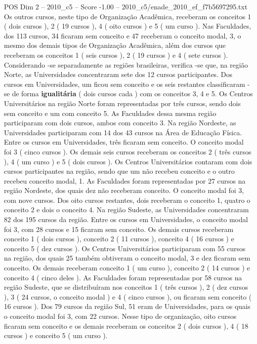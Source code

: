 \begin{textsample}{POS Dim 2 – 2010\_c5 – Score -1.00 – 2010\_c5/enade\_2010\_ef\_f7b5697295.txt}
Os outros cursos, neste tipo de Organização Acadêmica, receberam os conceitos 1 ( dois cursos ), 2 ( 19 cursos ), 4 ( oito cursos ) e 5 ( um curso ).
Nas Faculdades, dos 113 cursos, 34 ficaram sem conceito e 47 receberam o conceito modal, 3, o mesmo dos demais tipos de Organização Acadêmica, além dos cursos que receberam os conceitos 1 ( seis cursos ), 2 ( 19 cursos ) e 4 ( sete cursos ).
Considerando -se separadamente as regiões brasileiras, verifica -se que, na região Norte, as Universidades concentraram sete dos 12 cursos participantes.
Dos cursos em Universidades, um ficou sem conceito e os seis restantes classificaram -se de forma \textbf{igualitária} ( dois cursos cada ) com os conceitos 3, 4 e 5.
Os Centros Universitários na região Norte foram representadas por três cursos, sendo dois sem conceito e um com conceito 5.
As Faculdades dessa mesma região participaram com dois cursos, ambos com conceito 3.
Na região Nordeste, as Universidades participaram com 14 dos 43 cursos na Área de Educação Física.
Entre os cursos em Universidades, três ficaram sem conceito.
O conceito modal foi 3 ( cinco cursos ).
Os demais seis cursos receberam os conceitos 2 ( três cursos ), 4 ( um curso ) e 5 ( dois cursos ).
Os Centros Universitários contaram com dois cursos participantes na região, sendo que um não recebeu conceito e o outro recebeu conceito modal, 1.
As Faculdades foram representadas por 27 cursos na região Nordeste, dos quais dez não receberam conceito.
O conceito modal foi 3, com nove cursos.
Dos oito cursos restantes, dois receberam o conceito 1, quatro o conceito 2 e dois o conceito 4.
Na região Sudeste, as Universidades concentraram 82 dos 195 cursos da região.
Entre os cursos em Universidades, o conceito modal foi 3, com 28 cursos e 15 ficaram sem conceito.
Os demais cursos receberam conceito 1 ( dois cursos ), conceito 2 ( 11 cursos ), conceito 4 ( 16 cursos ) e conceito 5 ( dez cursos ).
Os Centros Universitários participaram com 55 cursos na região, dos quais 25 também obtiveram o conceito modal, 3 e dez ficaram sem conceito.
Os demais receberam conceito 1 ( um curso ), conceito 2 ( 14 cursos ) e conceito 4 ( cinco deles ).
As Faculdades foram representadas por 58 cursos na região Sudeste, que se distribuíram nos conceitos 1 ( três cursos ), 2 ( dez cursos ), 3 ( 24 cursos, o conceito modal ) e 4 ( cinco cursos ), ou ficaram sem conceito ( 16 cursos ).
Dos 79 cursos da região Sul, 51 eram de Universidades, para os quais o conceito modal foi 3, com 22 cursos.
Nesse tipo de organização, oito cursos ficaram sem conceito e os demais receberam os conceitos 2 ( dois cursos ), 4 ( 18 cursos ) e conceito 5 ( um curso ).

\end{textsample}
